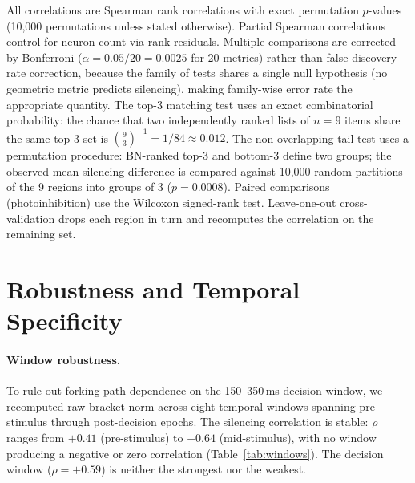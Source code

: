 \documentclass[9pt,lineno]{elife}
\begin{document}
All correlations are Spearman rank correlations with exact permutation $p$-values (10{,}000 permutations unless stated otherwise). Partial Spearman correlations control for neuron count via rank residuals. Multiple comparisons are corrected by Bonferroni ($\alpha = 0.05 / 20 = 0.0025$ for 20 metrics) rather than false-discovery-rate correction, because the family of tests shares a single null hypothesis (no geometric metric predicts silencing), making family-wise error rate the appropriate quantity. The top-3 matching test uses an exact combinatorial probability: the chance that two independently ranked lists of $n = 9$ items share the same top-3 set is $\binom{9}{3}^{-1} = 1/84 \approx 0.012$. The non-overlapping tail test uses a permutation procedure: BN-ranked top-3 and bottom-3 define two groups; the observed mean silencing difference is compared against 10{,}000 random partitions of the 9 regions into groups of 3 ($p = 0.0008$). Paired comparisons (photoinhibition) use the Wilcoxon signed-rank test. Leave-one-out cross-validation drops each region in turn and recomputes the correlation on the remaining set.




\clearpage
\appendix

\section{Robustness and Temporal Specificity}
\label{app:robustness}

\paragraph{Window robustness.} To rule out forking-path dependence on the 150--350\,ms decision window, we recomputed raw bracket norm across eight temporal windows spanning pre-stimulus through post-decision epochs. The silencing correlation is stable: $\rho$ ranges from $+0.41$ (pre-stimulus) to $+0.64$ (mid-stimulus), with no window producing a negative or zero correlation (Table~\ref{tab:windows}). The decision window ($\rho = +0.59$) is neither the strongest nor the weakest.
\end{document}
